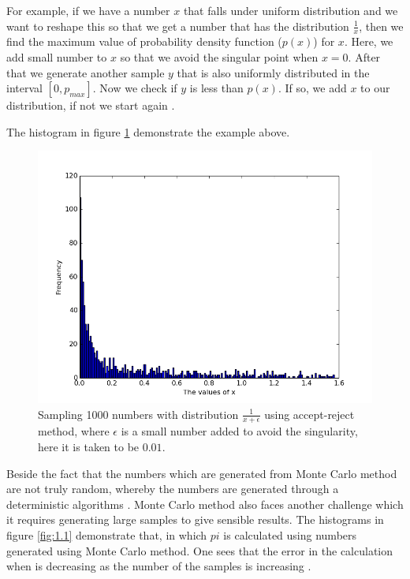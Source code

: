 For example, if we have a number $x$ that falls under uniform distribution and we want to reshape this so that we get a number  that has the distribution $\frac{1}{x}$, then we find the maximum value of probability density function ($p(x)$) for $x$. Here, we add small number to $x$ so that we avoid the singular point when $x = 0$. After that we generate another sample $y$ that is also uniformly distributed in the interval $[0,p_{max}]$. 
Now we check if $y $ is less than $p(x)$. If so, we add $x$ to our distribution, if not we start again \citep{Weinzierl}. 

The histogram in figure \ref{fig:2} demonstrate the example above. 

\begin{figure}[hbtp]
\centering
\includegraphics[scale=.5]{images/inverse_method.png}
\caption{Sampling 1000 numbers with distribution $\frac{1}{x+\epsilon}$ using accept-reject method, where $\epsilon$ is a small number added to avoid the singularity, here it is taken to be $0.01$.}\label{fig:2}
\end{figure}

Beside the fact that the numbers which are generated from Monte Carlo method  are not truly random, whereby the numbers are generated through a deterministic algorithms  \citep{montecarlo}. Monte Carlo method also faces another challenge which it requires generating large samples to give sensible results. The histograms in figure \ref{fig:1.1} demonstrate that, in which $pi$ is calculated using numbers generated using Monte Carlo method.    
One sees that the error in the calculation when is decreasing as the number of the samples is increasing .

